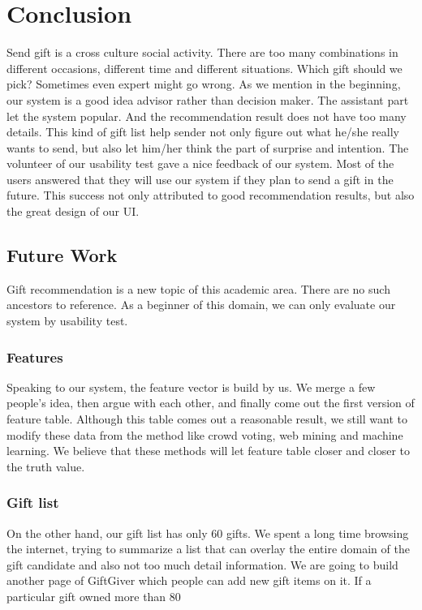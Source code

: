 \documentclass[11pt,twocolumn]{article}
\begin{document}
\section{Conclusion}

Send gift is a cross culture social activity.  There are too many combinations in different occasions, different time and different situations.   Which gift should we pick?   Sometimes even expert might go wrong.   
As we mention in the beginning, our system is a good idea advisor rather than decision maker.   The assistant part let the system popular.   And the recommendation result does not have too many details. This kind of gift list help sender not only figure out what he/she really wants to send, but also let him/her think the part of surprise and intention.
The volunteer of our usability test gave a nice feedback of our system.   Most of the users answered that they will use our system if they plan to send a gift in the future.   This success not only attributed to good recommendation results, but also the great design of our UI.

\subsection{Future Work}

Gift recommendation is a new topic of this academic area.   There are no such ancestors to reference.   As a beginner of this domain, we can only evaluate our system by usability test. 

\subsubsection{Features}
Speaking to our system, the feature vector is build by us.   We merge a few people’s idea, then argue with each other, and finally come out the first version of feature table.
Although this table comes out a reasonable result, we still want to modify these data from the method like crowd voting, web mining and machine learning.   We believe that these methods will let feature table closer and closer to the truth value.

\subsubsection{Gift list}
On the other hand, our gift list has only 60 gifts.   We spent a long time browsing the internet, trying to summarize a list that can overlay the entire domain of the gift candidate and also not too much detail information.   We are going to build another page of GiftGiver which people can add new gift items on it.   If a particular gift owned more than 80%
\end{document}
